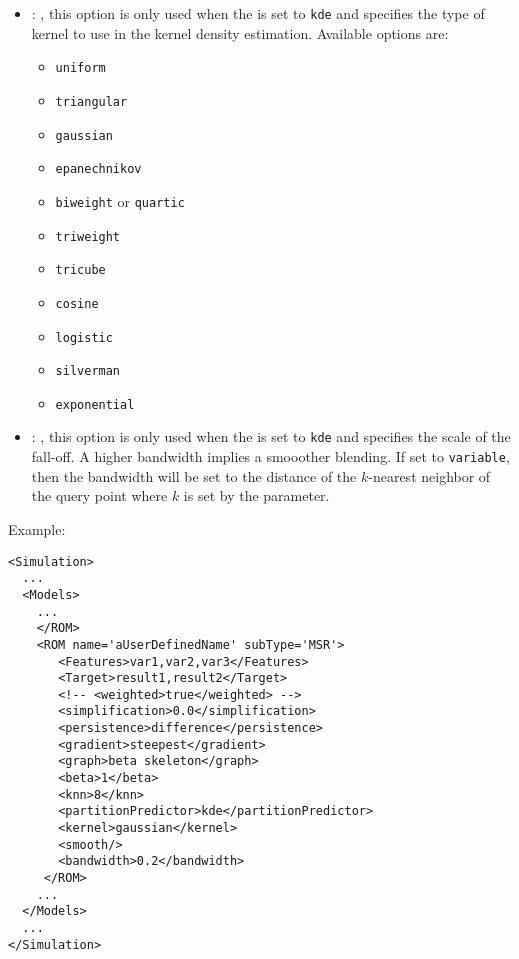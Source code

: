 \begin{itemize}
    \item {}: ,
      this option is only                                                  used when the
       is set to \texttt{kde} and
      specifies the type of kernel to use in the kernel density estimation.
      Available options are:                                                  \begin{itemize}
      \item \texttt{uniform}                                                    \item
      \texttt{triangular}                                                    \item \texttt{gaussian}
      \item \texttt{epanechnikov}                                                    \item
      \texttt{biweight} or \texttt{quartic}                                                    \item
      \texttt{triweight}                                                    \item \texttt{tricube}
      \item \texttt{cosine}                                                    \item
      \texttt{logistic}                                                    \item \texttt{silverman}
      \item \texttt{exponential}                                                  \end{itemize}

    \item {}: ,
      this                                                  option is only used when the
       is set to
      \texttt{kde} and specifies the scale of the fall-off. A higher bandwidth
      implies a smooother blending. If set to \texttt{variable}, then the bandwidth
      will be set to the distance of the $k$-nearest neighbor of the query point
      where $k$ is set by the  parameter.
  \end{itemize}

\hspace{24pt}
Example:
\begin{lstlisting}[style=XML,morekeywords={name,subType}]
<Simulation>
  ...
  <Models>
    ...
    </ROM>
    <ROM name='aUserDefinedName' subType='MSR'>
       <Features>var1,var2,var3</Features>
       <Target>result1,result2</Target>
       <!-- <weighted>true</weighted> -->
       <simplification>0.0</simplification>
       <persistence>difference</persistence>
       <gradient>steepest</gradient>
       <graph>beta skeleton</graph>
       <beta>1</beta>
       <knn>8</knn>
       <partitionPredictor>kde</partitionPredictor>
       <kernel>gaussian</kernel>
       <smooth/>
       <bandwidth>0.2</bandwidth>
     </ROM>
    ...
  </Models>
  ...
</Simulation>
\end{lstlisting}


